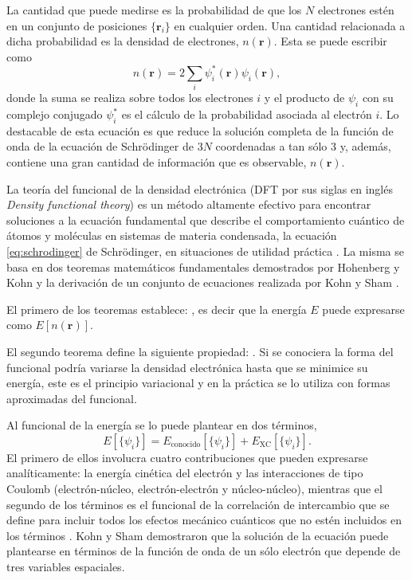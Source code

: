 La cantidad que puede medirse es la probabilidad de que los $N$ electrones 
estén en un conjunto de posiciones $\lbrace \mathbf{r}_i \rbrace$ en cualquier orden. 
Una cantidad relacionada a dicha probabilidad es la densidad de electrones,
$n(\mathbf{r})$. Esta se puede escribir como 
\begin{equation}
    n(\mathbf{r}) = 2 \sum_i \psi_i^*(\mathbf{r}) \psi_i(\mathbf{r}),
\end{equation}
donde la suma se realiza sobre todos los electrones $i$ y el producto de $\psi_i$ con su 
complejo conjugado $\psi_i^*$ es el cálculo de la probabilidad asociada al electrón $i$. 
Lo destacable de esta ecuación es que reduce la solución completa de la función de onda
de la ecuación de Schrödinger de $3 N$ coordenadas a tan sólo 3 y, además, contiene una 
gran cantidad de información que es observable, $n(\mathbf{r})$.

La teoría del funcional de la densidad electrónica (DFT por sus siglas en inglés
\textit{Density functional theory}) es un método altamente efectivo para 
encontrar soluciones a la ecuación fundamental que describe el comportamiento 
cuántico de átomos y moléculas en sistemas de materia condensada, la ecuación 
\ref{eq:schrodinger} de Schrödinger, en situaciones de utilidad práctica 
\cite{sholl2022}. La misma se basa en dos teoremas matemáticos fundamentales
demostrados por Hohenberg y Kohn \cite{hohenberg1964} y la derivación de un 
conjunto de ecuaciones realizada por Kohn y Sham \cite{kohn1965}.

El primero de los teoremas establece: , es decir que la energía $E$ puede expresarse como 
$E[n(\mathbf{r})]$.

El segundo teorema define la siguiente propiedad: .
Si se conociera la forma del funcional  podría variarse la 
densidad electrónica hasta que se minimice su energía, este es el principio 
variacional y en la práctica se lo utiliza con formas aproximadas del funcional.

Al funcional de la energía se lo puede plantear en dos términos,
\begin{equation}
    E[\lbrace \psi_i \rbrace] = E_{\text{conocido}}[\lbrace \psi_i \rbrace] + E_{\text{XC}}[\lbrace \psi_i \rbrace].
\end{equation}
El primero de ellos involucra cuatro contribuciones que pueden expresarse 
analíticamente: la energía cinética del electrón y las interacciones de tipo 
Coulomb (electrón-núcleo, electrón-electrón y núcleo-núcleo), mientras que
el segundo de los términos es el funcional de la correlación de intercambio
que se define para incluir todos los efectos mecánico cuánticos que no estén
incluidos en los términos . Kohn y Sham demostraron que la 
solución de la ecuación puede plantearse en términos de la función de onda 
de un sólo electrón que depende de tres variables espaciales.

